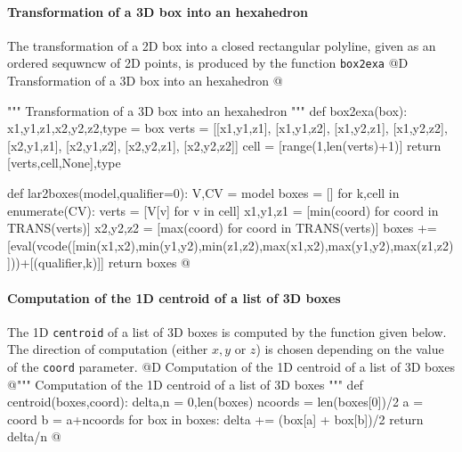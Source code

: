 \documentclass[11pt,oneside]{article}    %
\begin{document}
    
\paragraph{Transformation of a 3D box into an hexahedron}
The transformation of a 2D box into a closed rectangular polyline, given as an ordered sequwncw of 2D points, is produced by the function \texttt{box2exa}
@D Transformation of a 3D box into an hexahedron
@{""" Transformation of a 3D box into an hexahedron """    
def box2exa(box):
    x1,y1,z1,x2,y2,z2,type = box
    verts = [[x1,y1,z1], [x1,y1,z2], [x1,y2,z1], [x1,y2,z2], [x2,y1,z1], [x2,y1,z2], [x2,y2,z1], [x2,y2,z2]]
    cell = [range(1,len(verts)+1)]
    return [verts,cell,None],type

def lar2boxes(model,qualifier=0):
    V,CV = model
    boxes = []
    for k,cell in enumerate(CV):
        verts = [V[v] for v in cell]
        x1,y1,z1 = [min(coord) for coord in TRANS(verts)]
        x2,y2,z2 = [max(coord) for coord in TRANS(verts)]
        boxes += [eval(vcode([min(x1,x2),min(y1,y2),min(z1,z2),max(x1,x2),max(y1,y2),max(z1,z2)]))+[(qualifier,k)]]
    return boxes
@}
    
\paragraph{Computation of the 1D centroid of a list of 3D boxes}
The 1D \texttt{centroid} of a list of 3D boxes is computed by the function given below.
The direction of computation (either $x,y$ or $z$) is chosen depending on the value of the \texttt{coord} parameter. 
@D Computation of the 1D centroid of a list of 3D boxes
@{""" Computation of the 1D centroid of a list of 3D boxes """    
def centroid(boxes,coord):
    delta,n = 0,len(boxes)
    ncoords = len(boxes[0])/2
    a = coord%
    b = a+ncoords
    for box in boxes:
        delta += (box[a] + box[b])/2
    return delta/n
@}



\end{document}
